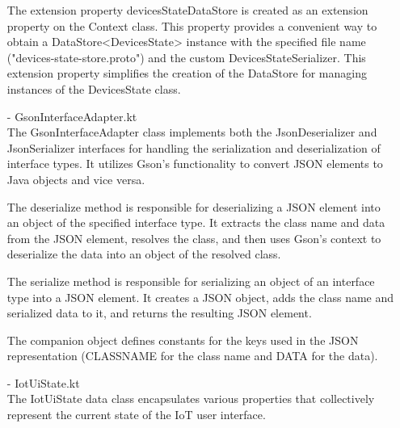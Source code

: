 \begin{enumerate}
                              The extension property devicesStateDataStore is created as an extension property on the Context class. This property provides a convenient way to obtain a DataStore<DevicesState> instance with the specified file name ("devices-state-store.proto") and the custom DevicesStateSerializer. This extension property simplifies the creation of the DataStore for managing instances of the DevicesState class.\\
                        \item[-] GsonInterfaceAdapter.kt\\
                              The GsonInterfaceAdapter class implements both the JsonDeserializer and JsonSerializer interfaces for handling the serialization and deserialization of interface types. It utilizes Gson's functionality to convert JSON elements to Java objects and vice versa.

                              The deserialize method is responsible for deserializing a JSON element into an object of the specified interface type. It extracts the class name and data from the JSON element, resolves the class, and then uses Gson's context to deserialize the data into an object of the resolved class.

                              The serialize method is responsible for serializing an object of an interface type into a JSON element. It creates a JSON object, adds the class name and serialized data to it, and returns the resulting JSON element.

                              The companion object defines constants for the keys used in the JSON representation (CLASSNAME for the class name and DATA for the data).\\
                        \item[-] IotUiState.kt\\
                              The IotUiState data class encapsulates various properties that collectively represent the current state of the IoT user interface.\\


\end{enumerate}
